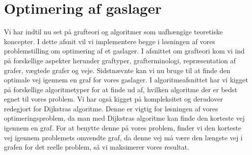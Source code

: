 \chapter{Optimering af gaslager}
Vi har indtil nu set på grafteori og algoritmer som  uafhængige teoretiske koncepter. I dette afsnit vil vi implementere begge i løsningen af vores problemstilling om optimering af et gaslager. I afsnittet om grafteori kom vi ind på forskellige aspekter herunder graftyper, grafterminologi, repræsentation af grafer, vægtede grafer og veje. Sidstnævnte kan vi nu bruge til at finde den optimale vej igennem en graf for vores gaslager. I algoritmeafsnittet har vi kigget på forskellige algoritmetyper for at finde ud af, hvilken algoritme der er bedst egnet til vores problem. Vi har også kigget på kompleksitet og derudover redegjort for Dijkstras algoritme. Denne er vigtig for løsningen af vores optimeringsproblem, da man med Dijkstras algoritme kan finde den korteste vej igennem en graf. For at benytte denne på vores problem, finder vi den korteste vej igennem problemets omvendte graf, da denne vej må være den længste vej i grafen for det reelle problem, så vi maksimerer vores resultat.



















